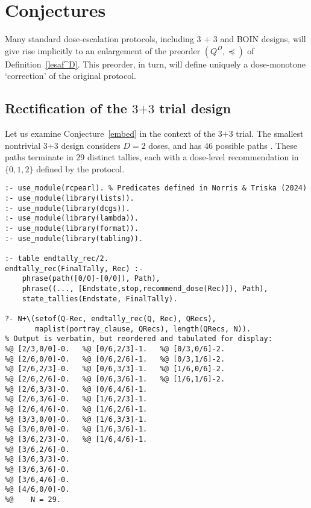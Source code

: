 \documentclass{article}
\begin{document}
\section{Conjectures}

\begin{conj}\label{embed}
  Many standard dose-escalation protocols, including $\mbox{3 + 3}$ and BOIN designs, will give rise implicitly to an enlargement of the preorder $(Q^D,\preceq)$ of Definition~\ref{lesaf^D}.  This preorder, in turn, will define uniquely a dose-monotone `correction' of the original protocol.
\end{conj}

\subsection{Rectification of the $\mbox{3+3}$ trial design}

Let us examine Conjecture~\ref{embed} in the context of the $\mbox{3+3}$ trial.  The smallest nontrivial $\mbox{3+3}$ design considers $D = 2$ doses, and has 46 possible paths \cite{norris_executable_2024}.  These paths terminate in 29 distinct tallies, each with a dose-level recommendation in $\{0, 1, 2\}$ defined by the protocol.

\begin{verbatim}
:- use_module(rcpearl). % Predicates defined in Norris & Triska (2024)
:- use_module(library(lists)).
:- use_module(library(dcgs)).
:- use_module(library(lambda)).
:- use_module(library(format)).
:- use_module(library(tabling)).

:- table endtally_rec/2.
endtally_rec(FinalTally, Rec) :-
    phrase(path([0/0]-[0/0]), Path),
    phrase((..., [Endstate,stop,recommend_dose(Rec)]), Path),
    state_tallies(Endstate, FinalTally).

?- N+\(setof(Q-Rec, endtally_rec(Q, Rec), QRecs),
       maplist(portray_clause, QRecs), length(QRecs, N)).
% Output is verbatim, but reordered and tabulated for display:
%@ [2/3,0/0]-0.   %@ [0/6,2/3]-1.   %@ [0/3,0/6]-2.
%@ [2/6,0/0]-0.   %@ [0/6,2/6]-1.   %@ [0/3,1/6]-2.
%@ [2/6,2/3]-0.   %@ [0/6,3/3]-1.   %@ [1/6,0/6]-2.
%@ [2/6,2/6]-0.   %@ [0/6,3/6]-1.   %@ [1/6,1/6]-2.
%@ [2/6,3/3]-0.   %@ [0/6,4/6]-1.
%@ [2/6,3/6]-0.   %@ [1/6,2/3]-1.
%@ [2/6,4/6]-0.   %@ [1/6,2/6]-1.
%@ [3/3,0/0]-0.   %@ [1/6,3/3]-1.
%@ [3/6,0/0]-0.   %@ [1/6,3/6]-1.
%@ [3/6,2/3]-0.   %@ [1/6,4/6]-1.
%@ [3/6,2/6]-0.
%@ [3/6,3/3]-0.
%@ [3/6,3/6]-0.
%@ [3/6,4/6]-0.
%@ [4/6,0/0]-0.
%@    N = 29.
\end{verbatim}
\end{document}
